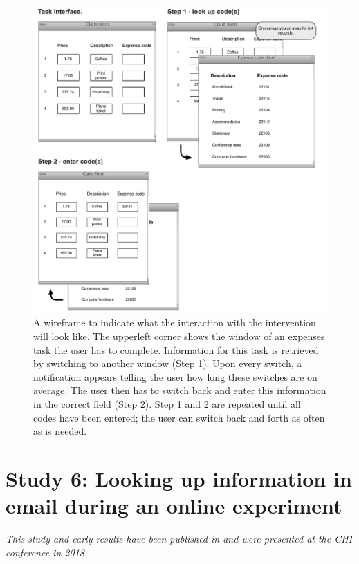 \begin{figure}
\centering
\includegraphics[width=\textwidth]{images/ch56/ch56-wireframe.pdf}
\caption{A wireframe to indicate what the interaction with the intervention will look like. The upperleft corner shows the window of an expenses task the user has to complete. Information for this task is retrieved by switching to another window (Step 1). Upon every switch, a notification appears telling the user how long these switches are on average. The user then has to switch back and enter this information in the correct field (Step 2). Step 1 and 2 are repeated until all codes have been entered; the user can switch back and forth as often as is needed.}
\label{fig:ch56-6_Wireframe}
\end{figure}

\section{Study 6: Looking up information in email during an online experiment}
\textit{This study and early results have been published in \citet{Borghouts2018a} and were presented at the CHI conference in 2018.}

